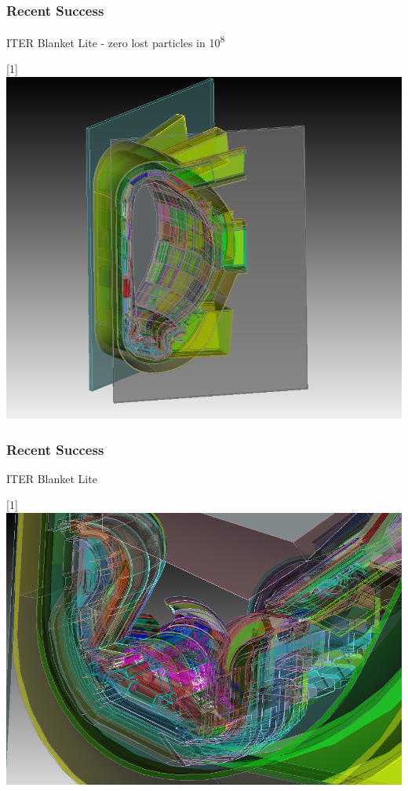 \documentclass[14pt]{beamer}
\begin{document}
\begin{frame}
\frametitle{Recent Success}

ITER Blanket Lite
 - zero lost particles in 10\textsuperscript{8}
\begin{center}
\scalebox{-1}[1]{\includegraphics[scale=0.3]{blanketlitemodel.png}}
\end{center}

\end{frame}

\begin{frame}
\frametitle{Recent Success}

ITER Blanket Lite
\begin{center}
\scalebox{-1}[1]{\includegraphics[scale=0.3]{blanketlitemodel_detail.png}}
\end{center}

\end{frame}
\end{document}
